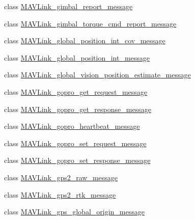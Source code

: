 \begin{DoxyCompactItemize}
\item 
class \hyperlink{classpymavlink_1_1dialects_1_1v10_1_1MAVLink__gimbal__report__message}{M\+A\+V\+Link\+\_\+gimbal\+\_\+report\+\_\+message}
\item 
class \hyperlink{classpymavlink_1_1dialects_1_1v10_1_1MAVLink__gimbal__torque__cmd__report__message}{M\+A\+V\+Link\+\_\+gimbal\+\_\+torque\+\_\+cmd\+\_\+report\+\_\+message}
\item 
class \hyperlink{classpymavlink_1_1dialects_1_1v10_1_1MAVLink__global__position__int__cov__message}{M\+A\+V\+Link\+\_\+global\+\_\+position\+\_\+int\+\_\+cov\+\_\+message}
\item 
class \hyperlink{classpymavlink_1_1dialects_1_1v10_1_1MAVLink__global__position__int__message}{M\+A\+V\+Link\+\_\+global\+\_\+position\+\_\+int\+\_\+message}
\item 
class \hyperlink{classpymavlink_1_1dialects_1_1v10_1_1MAVLink__global__vision__position__estimate__message}{M\+A\+V\+Link\+\_\+global\+\_\+vision\+\_\+position\+\_\+estimate\+\_\+message}
\item 
class \hyperlink{classpymavlink_1_1dialects_1_1v10_1_1MAVLink__gopro__get__request__message}{M\+A\+V\+Link\+\_\+gopro\+\_\+get\+\_\+request\+\_\+message}
\item 
class \hyperlink{classpymavlink_1_1dialects_1_1v10_1_1MAVLink__gopro__get__response__message}{M\+A\+V\+Link\+\_\+gopro\+\_\+get\+\_\+response\+\_\+message}
\item 
class \hyperlink{classpymavlink_1_1dialects_1_1v10_1_1MAVLink__gopro__heartbeat__message}{M\+A\+V\+Link\+\_\+gopro\+\_\+heartbeat\+\_\+message}
\item 
class \hyperlink{classpymavlink_1_1dialects_1_1v10_1_1MAVLink__gopro__set__request__message}{M\+A\+V\+Link\+\_\+gopro\+\_\+set\+\_\+request\+\_\+message}
\item 
class \hyperlink{classpymavlink_1_1dialects_1_1v10_1_1MAVLink__gopro__set__response__message}{M\+A\+V\+Link\+\_\+gopro\+\_\+set\+\_\+response\+\_\+message}
\item 
class \hyperlink{classpymavlink_1_1dialects_1_1v10_1_1MAVLink__gps2__raw__message}{M\+A\+V\+Link\+\_\+gps2\+\_\+raw\+\_\+message}
\item 
class \hyperlink{classpymavlink_1_1dialects_1_1v10_1_1MAVLink__gps2__rtk__message}{M\+A\+V\+Link\+\_\+gps2\+\_\+rtk\+\_\+message}
\item 
class \hyperlink{classpymavlink_1_1dialects_1_1v10_1_1MAVLink__gps__global__origin__message}{M\+A\+V\+Link\+\_\+gps\+\_\+global\+\_\+origin\+\_\+message}

\end{DoxyCompactItemize}
